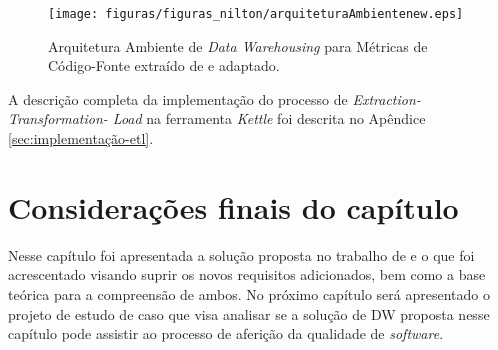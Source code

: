 	\begin{figure}[h!]
\centering
\texttt{[image: figuras/figuras\_nilton/arquiteturaAmbientenew.eps]}
\caption{Arquitetura Ambiente de \textit{Data Warehousing} para Métricas de Código-Fonte extraído de  e adaptado.}
\label{fig:arquiteturaAmbientenew}
\end{figure}
\FloatBarrier

A descrição completa da implementação do processo de \textit{Extraction-Transformation-
Load} na ferramenta \textit{Kettle} foi descrita no Apêndice \ref{sec:implementação-etl}. 

\section{Considerações finais do capítulo}

Nesse capítulo foi apresentada a solução proposta no trabalho de  e o que foi acrescentado visando suprir os novos requisitos adicionados, bem como a base teórica para a compreensão de ambos. No próximo capítulo será apresentado o projeto de estudo de caso que visa analisar se a solução de DW proposta nesse capítulo pode assistir ao processo de aferição da qualidade de \textit{software}.
